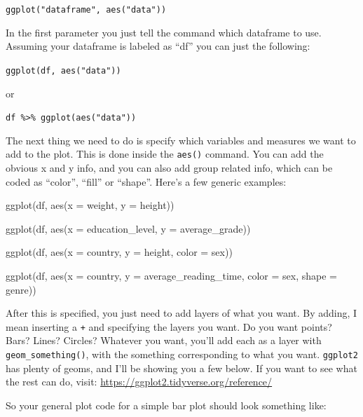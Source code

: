 \documentclass[
]{book}
\newenvironment{Shaded}{\begin{snugshade}}{\end{snugshade}}
\newcommand{\AttributeTok}[1]{\textcolor[rgb]{0.77,0.63,0.00}{#1}}
\newcommand{\FunctionTok}[1]{\textcolor[rgb]{0.00,0.00,0.00}{#1}}
\newcommand{\NormalTok}[1]{#1}
\begin{document}
\texttt{ggplot("dataframe",\ aes("data"))}

In the first parameter you just tell the command which dataframe to use.
Assuming your dataframe is labeled as ``df'' you can just the following:

\texttt{ggplot(df,\ aes("data"))}

or

\texttt{df\ \%\textgreater{}\%\ ggplot(aes("data"))}

The next thing we need to do is specify which variables and measures we want to add to the plot.
This is done inside the \texttt{aes()} command.
You can add the obvious x and y info, and you can also add group related info, which can be coded as ``color'', ``fill'' or ``shape''.
Here's a few generic examples:

\begin{Shaded}
\begin{Highlighting}[]
\FunctionTok{ggplot}\NormalTok{(df, }\FunctionTok{aes}\NormalTok{(}\AttributeTok{x =}\NormalTok{ weight, }\AttributeTok{y =}\NormalTok{ height))}

\FunctionTok{ggplot}\NormalTok{(df, }\FunctionTok{aes}\NormalTok{(}\AttributeTok{x =}\NormalTok{ education\_level, }\AttributeTok{y =}\NormalTok{ average\_grade))}

\FunctionTok{ggplot}\NormalTok{(df, }\FunctionTok{aes}\NormalTok{(}\AttributeTok{x =}\NormalTok{ country, }\AttributeTok{y =}\NormalTok{ height, }\AttributeTok{color =}\NormalTok{ sex))}

\FunctionTok{ggplot}\NormalTok{(df, }\FunctionTok{aes}\NormalTok{(}\AttributeTok{x =}\NormalTok{ country, }\AttributeTok{y =}\NormalTok{ average\_reading\_time,}
               \AttributeTok{color =}\NormalTok{ sex, }\AttributeTok{shape =}\NormalTok{ genre))}
\end{Highlighting}
\end{Shaded}

After this is specified, you just need to add layers of what you want.
By adding, I mean inserting a \texttt{+} and specifying the layers you want.
Do you want points?
Bars?
Lines?
Circles?
Whatever you want, you'll add each as a layer with \texttt{geom\_something()}, with the something corresponding to what you want.
\texttt{ggplot2} has plenty of geoms, and I'll be showing you a few below.
If you want to see what the rest can do, visit: \url{https://ggplot2.tidyverse.org/reference/}

So your general plot code for a simple bar plot should look something like:
\end{document}
